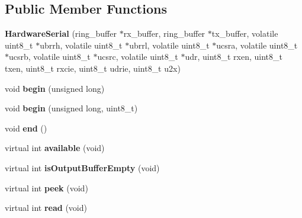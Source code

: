 \subsection*{Public Member Functions}
\begin{DoxyCompactItemize}
\item 
\hypertarget{class_hardware_serial_a3f8623cacdc470b5415c9aaca8bb443d}{}{\bfseries Hardware\+Serial} (ring\+\_\+buffer $\ast$rx\+\_\+buffer, ring\+\_\+buffer $\ast$tx\+\_\+buffer, volatile uint8\+\_\+t $\ast$ubrrh, volatile uint8\+\_\+t $\ast$ubrrl, volatile uint8\+\_\+t $\ast$ucsra, volatile uint8\+\_\+t $\ast$ucsrb, volatile uint8\+\_\+t $\ast$ucsrc, volatile uint8\+\_\+t $\ast$udr, uint8\+\_\+t rxen, uint8\+\_\+t txen, uint8\+\_\+t rxcie, uint8\+\_\+t udrie, uint8\+\_\+t u2x)\label{class_hardware_serial_a3f8623cacdc470b5415c9aaca8bb443d}

\item 
\hypertarget{class_hardware_serial_a8b36de01c04d1e7f94178b34caad3729}{}void {\bfseries begin} (unsigned long)\label{class_hardware_serial_a8b36de01c04d1e7f94178b34caad3729}

\item 
\hypertarget{class_hardware_serial_aad4db7a746742b1023a6157419d9b63c}{}void {\bfseries begin} (unsigned long, uint8\+\_\+t)\label{class_hardware_serial_aad4db7a746742b1023a6157419d9b63c}

\item 
\hypertarget{class_hardware_serial_a0f86c41f580e04bdf30ea00e9014eacd}{}void {\bfseries end} ()\label{class_hardware_serial_a0f86c41f580e04bdf30ea00e9014eacd}

\item 
\hypertarget{class_hardware_serial_a60e2bb4a3f40cfaf94601cd4e3333f43}{}virtual int {\bfseries available} (void)\label{class_hardware_serial_a60e2bb4a3f40cfaf94601cd4e3333f43}

\item 
\hypertarget{class_hardware_serial_a87115b982d13a3103f01b94025a08483}{}virtual int {\bfseries is\+Output\+Buffer\+Empty} (void)\label{class_hardware_serial_a87115b982d13a3103f01b94025a08483}

\item 
\hypertarget{class_hardware_serial_a69b3cfa7d35cc8102fe14e302034f194}{}virtual int {\bfseries peek} (void)\label{class_hardware_serial_a69b3cfa7d35cc8102fe14e302034f194}

\item 
\hypertarget{class_hardware_serial_a760f254188b4687f5a8a74f4ddd3c83d}{}virtual int {\bfseries read} (void)\label{class_hardware_serial_a760f254188b4687f5a8a74f4ddd3c83d}


\end{DoxyCompactItemize}
